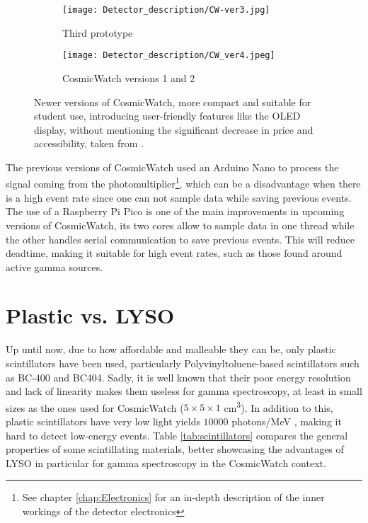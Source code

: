 \begin{figure}[H]
  \begin{subfigure}[t]{0.45\textwidth}
    \centering
    \texttt{[image: Detector\_description/CW-ver3.jpg]}
    \caption{\label{sfig:CW_ver3} Third prototype}
  \end{subfigure}
  \hfill
  \begin{subfigure}[t]{0.45\textwidth}
    \centering
    \texttt{[image: Detector\_description/CW\_ver4.jpeg]}
    \caption{\label{sfig:CW_ver4} CosmicWatch versions 1 and 2}
  \end{subfigure}
  \caption{\label{fig:CW_ver3_ver4}Newer versions of CosmicWatch, more compact and suitable for student use, introducing user-friendly features like the OLED display, without mentioning the significant decrease in price and accessibility, taken from \cite{CosmicWatch}.}
\end{figure}

The previous versions of CosmicWatch used an Arduino Nano to process the signal coming from the photomultiplier\footnote{See chapter \ref{chap:Electronics} for an in-depth description of the inner workings of the detector electronics}, which can be a disadvantage when there is a high event rate since one can not sample data while saving previous events. The use of a Raspberry Pi Pico is one of the main improvements in upcoming versions of CosmicWatch, its two cores allow to sample data in one thread while the other handles serial communication to save previous events. This will reduce deadtime, making it suitable for high event rates, such as those found around active gamma sources.

\section{Plastic vs. LYSO}\label{sec:self_radiation}

Up until now, due to how affordable and malleable they can be, only plastic scintillators have been used, particularly Polyvinyltoluene-based scintillators such as BC-400 and BC404. Sadly, it is well known that their poor energy resolution and lack of linearity makes them useless for gamma spectroscopy, at least in small sizes as the ones used for CosmicWatch ($5\times5\times1$ \unit{\cm\cubed}). In addition to this, plastic scintillators have very low light yields $10000$ photons/MeV \cite{mukhopadhyay2004plastic}, making it hard to detect low-energy events. Table \ref{tab:scintillators} compares the general properties of some scintillating materials, better showcasing the advantages of LYSO in particular for gamma spectroscopy in the CosmicWatch context.

